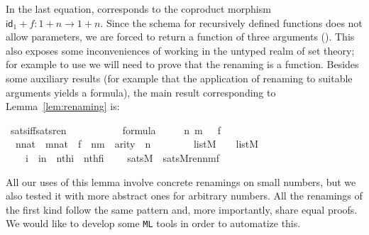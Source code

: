 In the last equation,  corresponds to
the coproduct morphism $\mathsf{id}_{1}+f \colon 1 + n \to 1 +
n$. Since the schema for recursively defined functions does not allow
parameters, we are forced to return a function of three arguments
(). This also exposes some inconveniences of working in the
untyped realm of set theory; for example to use  we will need
to prove that the renaming is a function. Besides some auxiliary
results (for example that the application of renaming to suitable
arguments yields a formula), the main result corresponding to
Lemma~\ref{lem:renaming} is:
\begin{isabelle}
\isamarkupfalse%
\ sats{\isacharunderscore}iff{\isacharunderscore}sats{\isacharunderscore}ren\ {\isacharcolon}\ \isanewline
\ \ \ {\isasymphi}\isanewline
\ \ \ {\isachardoublequoteopen}{\isasymphi}\ {\isasymin}\ formula{\isachardoublequoteclose}\isanewline
\ \ \ \ {\isachardoublequoteopen}{\isasymAnd}\ n\ m\ {\isasymrho}\ {\isasymrho}{\isacharprime}\ f\ {\isachardot}\ \isanewline
\ \ {\isasymlbrakk}n{\isasymin}nat\ {\isacharsemicolon}\ m{\isasymin}nat\ {\isacharsemicolon}\ f\ {\isasymin}\ n{\isasymrightarrow}m\ {\isacharsemicolon}\ arity{\isacharparenleft}{\isasymphi}{\isacharparenright}\ {\isasymle}\ n\ {\isacharsemicolon}\isanewline
\ \ \ \ \ {\isasymrho}\ {\isasymin}\ list{\isacharparenleft}M{\isacharparenright}\ {\isacharsemicolon}\ {\isasymrho}{\isacharprime}\ {\isasymin}\ list{\isacharparenleft}M{\isacharparenright}\ {\isacharsemicolon}\ \isanewline
\ \ \ {\isasymAnd}\ i\ {\isachardot}\ i{\isacharless}n\ {\isasymLongrightarrow}\ nth{\isacharparenleft}i{\isacharcomma}{\isasymrho}{\isacharparenright}\ {\isacharequal}\ nth{\isacharparenleft}f{\isacharbackquote}i{\isacharcomma}{\isasymrho}{\isacharprime}{\isacharparenright}\ {\isasymrbrakk}\ {\isasymLongrightarrow}\isanewline
\ \ sats{\isacharparenleft}M{\isacharcomma}{\isasymphi}{\isacharcomma}{\isasymrho}{\isacharparenright}\ {\isasymlongleftrightarrow}\ sats{\isacharparenleft}M{\isacharcomma}ren{\isacharparenleft}{\isasymphi}{\isacharparenright}{\isacharbackquote}n{\isacharbackquote}m{\isacharbackquote}f{\isacharcomma}{\isasymrho}{\isacharprime}{\isacharparenright}{\isachardoublequoteclose}\end{isabelle}

All our uses of this lemma involve concrete renamings on small
numbers, but we also tested it with more abstract ones for arbitrary
numbers. All the renamings of the first kind follow the same pattern
and, more importantly, share equal proofs. We would like to develop
some \texttt{ML} tools in order to automatize this.


